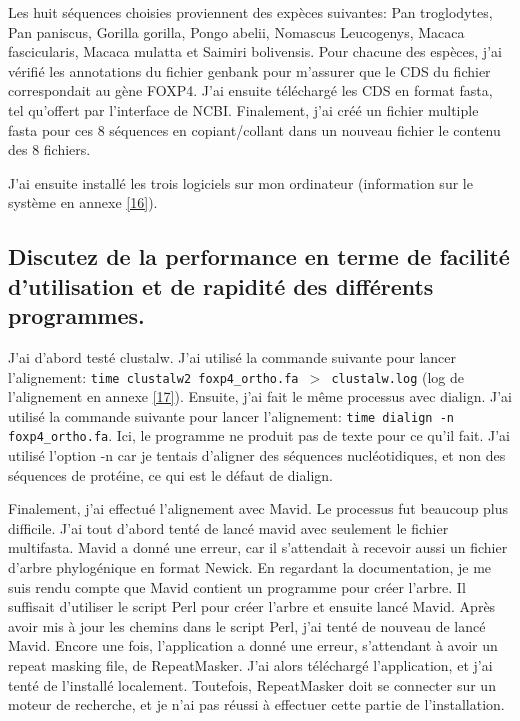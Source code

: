 \documentclass[11pt]{article} %
\begin{document}
Les huit séquences choisies proviennent des expèces suivantes: Pan troglodytes, Pan paniscus, Gorilla gorilla,
Pongo abelii, Nomascus Leucogenys, Macaca fascicularis, Macaca mulatta et Saimiri bolivensis. Pour chacune
des espèces, j'ai vérifié les annotations du fichier genbank pour m'assurer que le CDS du fichier correspondait
au gène FOXP4. J'ai ensuite téléchargé les CDS en format fasta, tel qu'offert par l'interface de NCBI.
Finalement, j'ai créé un fichier multiple fasta pour ces 8 séquences en copiant/collant dans un nouveau fichier
le contenu des 8 fichiers.

J'ai ensuite installé les trois logiciels sur mon ordinateur (information sur le système en annexe \ref{16}).

\subsection[Facilité et rapidité des programmes]{Discutez de la performance en terme de facilité d'utilisation
et de rapidité des différents programmes.}

J'ai d'abord testé clustalw. J'ai utilisé la commande suivante pour lancer l'alignement: 
\texttt{time clustalw2 foxp4\_ortho.fa $>$ clustalw.log} (log de l'alignement en annexe \ref{17}). Ensuite,
j'ai fait le même processus avec dialign. J'ai utilisé la commande suivante pour lancer l'alignement:
\texttt{time dialign -n foxp4\_ortho.fa}. Ici, le programme ne produit pas de texte pour ce qu'il fait. J'ai
utilisé l'option -n car je tentais d'aligner des séquences nucléotidiques, et non des séquences de protéine,
ce qui est le défaut de dialign.

Finalement, j'ai effectué l'alignement avec Mavid. Le processus fut beaucoup plus difficile. J'ai tout d'abord
tenté de lancé mavid avec seulement le fichier multifasta. Mavid a donné une erreur, car il s'attendait à
recevoir aussi un fichier d'arbre phylogénique en format Newick. En regardant la documentation, je me
suis rendu compte que Mavid contient un programme pour créer l'arbre. Il suffisait d'utiliser le script
Perl pour créer l'arbre et ensuite lancé Mavid. Après avoir mis à jour les chemins dans le script Perl,
j'ai tenté de nouveau de lancé Mavid. Encore une fois, l'application a donné une erreur, s'attendant à
avoir un repeat masking file, de RepeatMasker. J'ai alors téléchargé l'application, et j'ai tenté de
l'installé localement. Toutefois, RepeatMasker doit se connecter sur un moteur de recherche, et je n'ai
pas réussi à effectuer cette partie de l'installation.
\end{document}
